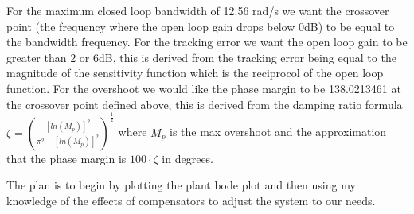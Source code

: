 \documentclass{article}
\begin{document}
For the maximum closed loop bandwidth of 12.56 rad/s we want the crossover point (the frequency where the open loop gain drops below 0dB) to be equal to the bandwidth frequency.
For the tracking error we want the open loop gain to be greater than 2 or 6dB, this is derived from the tracking error being equal to the magnitude of the sensitivity function which is the reciprocol of the open loop function.
For the overshoot we would like the phase margin to be 138.0213461 at the crossover point defined above, this is derived from the damping ratio formula $\zeta=(\frac{[ln(M_p)]^2}{\pi^2 + [ln(M_p)]^2})^{\frac{1}{2}}$ where $M_p$ is the max overshoot and the approximation that the phase margin is $100\cdot\zeta$ in degrees.

The plan is to begin by plotting the plant bode plot and then using my knowledge of the effects of compensators to adjust the system to our needs.
\end{document}
